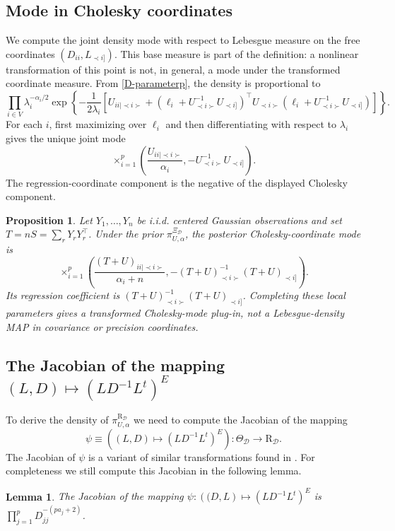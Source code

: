 \documentclass[12pt]{article}
\newcommand{\D}{\mathcal{D}}
\theoremstyle{plain}
\newtheorem{lemma}[theorem]{Lemma}
\newtheorem{proposition}[theorem]{Proposition}
\theoremstyle{definition}
\theoremstyle{remark}
\begin{document}
\subsection{Mode in Cholesky coordinates}
We compute the joint density mode with respect to Lebesgue measure on
the free coordinates \((D_{ii},L_{\prec i]})\).  This base measure is
part of the definition: a nonlinear transformation of this point is
not, in general, a mode under the transformed coordinate measure.
From \eqref{D-parameterp}, the density is proportional to
 \[
 \prod_{i\in V}
 \lambda_i^{-\alpha_i/2}
 \exp\left\{-\frac{1}{2\lambda_i}
 \left[
 U_{ii\mid\prec i\succ}
 +(\ell_i+U^{-1}_{\prec i\succ}U_{\prec i]})^\top
 U_{\prec i\succ}
 (\ell_i+U^{-1}_{\prec i\succ}U_{\prec i]})
 \right]\right\}.
 \]
For each \(i\), first maximizing over \(\ell_i\) and then
differentiating with respect to \(\lambda_i\) gives the unique joint
mode
 \[
 \mathop{\times}_{i=1}^{p}
 \left(
 \frac{U_{ii\mid\prec i\succ}}{\alpha_i},
 -U^{-1}_{\prec i\succ}U_{\prec i]}
 \right).
 \]
The regression-coordinate component is the negative of the displayed
Cholesky component.

\begin{proposition}\label{prop:chol-mode}
Let \(Y_1,\ldots,Y_n\) be i.i.d. centered Gaussian observations and set
\(T=nS=\sum_rY_rY_r^\top\).  Under the prior
\(\pi^{\Xi_{\D}}_{U,\alpha}\), the posterior Cholesky-coordinate mode is
\[
 \mathop{\times}_{i=1}^{p}\left(
 \frac{(T+U)_{ii\mid\prec i\succ}}{\alpha_i+n},
 -(T+U)_{\prec i\succ}^{-1}(T+U)_{\prec i]}
 \right).
\]
Its regression coefficient is
\((T+U)_{\prec i\succ}^{-1}(T+U)_{\prec i]}\).  Completing these local
parameters gives a transformed Cholesky-mode plug-in, not a
Lebesgue-density MAP in covariance or precision coordinates.
\end{proposition}
\subsection*{The Jacobian of the mapping $\left(L,D\right)\mapsto\left(LD^{-1}L^{t}\right)^{E}$}
To derive the density of $\pi_{U,\alpha}^{\mathrm{R}_{\D}}$ we need to compute the Jacobian of the mapping 
\[
\psi\equiv \left(\left(L,D\right)\mapsto\left(LD^{-1}L^{t}\right)^{E}\right):\Theta_{\D}\rightarrow\mathrm{R}_{\D}.
\]
 The  Jacobian  of $\psi$ is a variant of similar transformations found in \cite{roverato00*, khare09a*}. For completeness we still compute this Jacobian  in the following lemma.

\begin{lemma} \label{lem:jacobian_of_psi_supp}
The Jacobian of the mapping $\psi:\left( (D, L\right)\mapsto\left( LD^{-1}L^t\right)^{E}$ is $\prod_{j=1}^p D_{jj} ^{-(pa_j+2)}$.
\end{lemma}
\end{document}
